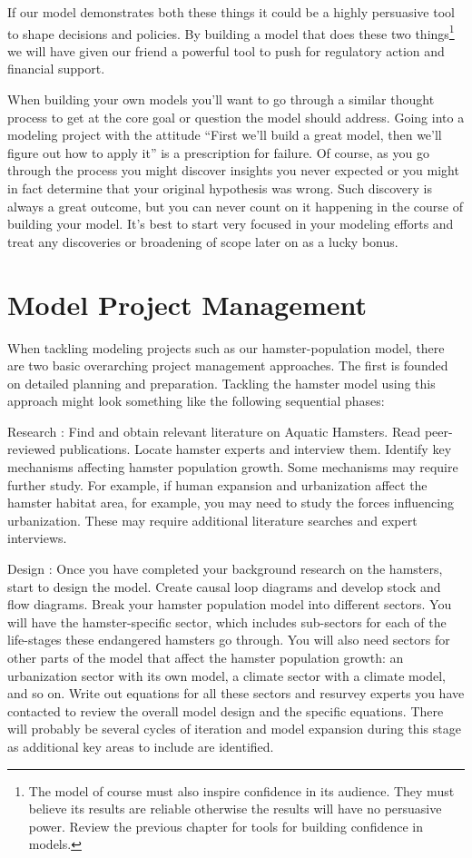 \documentclass[]{memoir}
\begin{document}
If our model demonstrates both these things it could be a highly
persuasive tool to shape decisions and policies. By building a model
that does these two things\footnote{The model of course must also
  inspire confidence in its audience. They must believe its results are
  reliable otherwise the results will have no persuasive power. Review
  the previous chapter for tools for building confidence in models.} we
will have given our friend a powerful tool to push for regulatory action
and financial support.

When building your own models you'll want to go through a similar
thought process to get at the core goal or question the model should
address. Going into a modeling project with the attitude ``First we'll
build a great model, then we'll figure out how to apply it'' is a
prescription for failure. Of course, as you go through the process you
might discover insights you never expected or you might in fact
determine that your original hypothesis was wrong. Such discovery is
always a great outcome, but you can never count on it happening in the
course of building your model. It's best to start very focused in your
modeling efforts and treat any discoveries or broadening of scope later
on as a lucky bonus.

\section{Model Project Management}

When tackling modeling projects such as our hamster-population model,
there are two basic overarching project management approaches. The first
is founded on detailed planning and preparation. Tackling the hamster
model using this approach might look something like the following
sequential phases:

Research : Find and obtain relevant literature on Aquatic Hamsters. Read
peer-reviewed publications. Locate hamster experts and interview them.
Identify key mechanisms affecting hamster population growth. Some
mechanisms may require further study. For example, if human expansion
and urbanization affect the hamster habitat area, for example, you may
need to study the forces influencing urbanization. These may require
additional literature searches and expert interviews.

Design : Once you have completed your background research on the
hamsters, start to design the model. Create causal loop diagrams and
develop stock and flow diagrams. Break your hamster population model
into different sectors. You will have the hamster-specific sector, which
includes sub-sectors for each of the life-stages these endangered
hamsters go through. You will also need sectors for other parts of the
model that affect the hamster population growth: an urbanization sector
with its own model, a climate sector with a climate model, and so on.
Write out equations for all these sectors and resurvey experts you have
contacted to review the overall model design and the specific equations.
There will probably be several cycles of iteration and model expansion
during this stage as additional key areas to include are identified.
\end{document}
